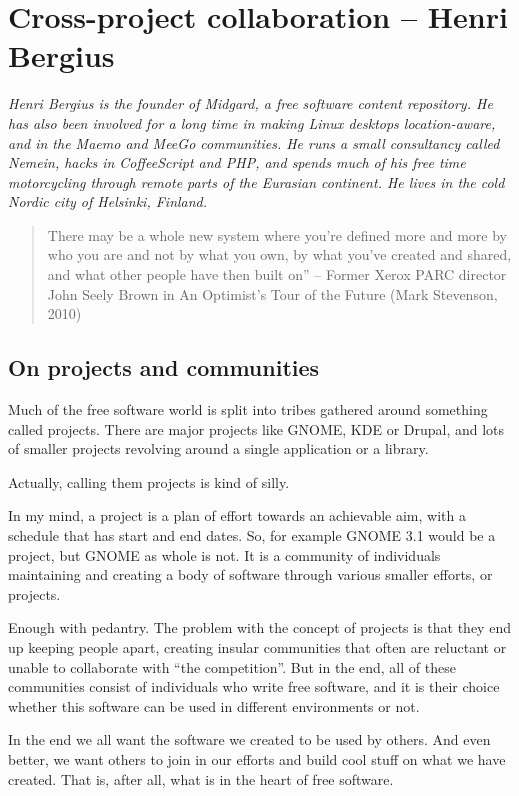 \chapter{Cross-project collaboration -- Henri Bergius}

\textit{Henri Bergius is the founder of Midgard, a free software content
repository. He has also been involved for a long time in making Linux desktops
location-aware, and in the Maemo and MeeGo communities. He runs a small
consultancy called Nemein, hacks in CoffeeScript and PHP, and spends much of his
free time motorcycling through remote parts of the Eurasian continent. He lives
in the cold Nordic city of Helsinki, Finland.}

\begin{quote}
There may be a whole new system where you're defined more and more by who you
are and not by what you own, by what you've created and shared, and what other
people have then built on” -- Former Xerox PARC director John Seely Brown in An
Optimist's Tour of the Future (Mark Stevenson, 2010)
\end{quote}

\section*{On projects and communities}

Much of the free software world is split into tribes gathered around something
called projects. There are major projects like GNOME, KDE or Drupal, and lots of
smaller projects revolving around a single application or a library.

Actually, calling them projects is kind of silly.

In my mind, a project is a plan of effort towards an achievable aim, with a
schedule that has start and end dates. So, for example GNOME 3.1 would be a
project, but GNOME as whole is not. It is a community of individuals maintaining
and creating a body of software through various smaller efforts, or projects.

Enough with pedantry. The problem with the concept of projects is that they end
up keeping people apart, creating insular communities that often are reluctant
or unable to collaborate with ``the competition''. But in the end, all of these
communities consist of individuals who write free software, and it is their
choice whether this software can be used in different environments or not.

In the end we all want the software we created to be used by others. And even
better, we want others to join in our efforts and build cool stuff on what we
have created. That is, after all, what is in the heart of free software.

